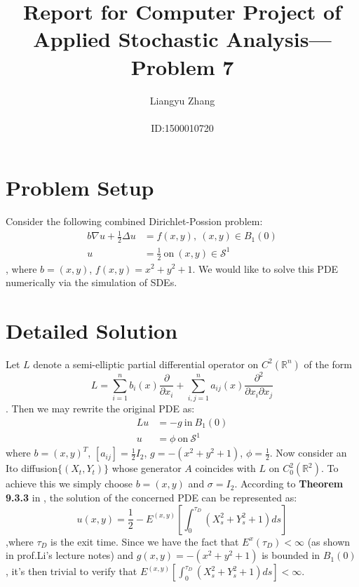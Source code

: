 \documentclass[a4paper]{article}
\title{Report for Computer Project of Applied Stochastic Analysis---Problem 7}
\author{Liangyu Zhang \\ \\ ID:1500010720}
\begin{document}
\maketitle

\section{Problem Setup}

Consider the following combined Dirichlet-Possion problem:
\begin{displaymath}
\begin{aligned}
    b \nabla u + \frac{1}{2}\Delta u &= f(x, y),\ (x,y)\in B_1(0)\\
    u &= \frac{1}{2}\ \text{on}\ (x,y)\in \mathcal{S}^1
\end{aligned}
\end{displaymath}
, where $b=(x, y)$, $f(x, y) = x^2 + y^2 + 1$. We would like to solve this PDE numerically via the simulation of SDEs.

\section{Detailed Solution}
Let $L$ denote a semi-elliptic partial differential operator on $C^2(\mathbb{R} ^n)$ of the form
\begin{displaymath}
L=\sum_{i=1}^n b_i(x)\frac{\partial}{\partial x_i} + \sum_{i,j=1}^n a_{ij}(x)\frac{\partial ^2}{\partial x_i \partial x_j}
\end{displaymath}
. Then we may rewrite the original PDE as:
\begin{displaymath}
\begin{aligned}
Lu &= -g\ \text{in}\ B_1(0)\\
u &= \phi\ \text{on}\ \mathcal{S}^1
\end{aligned}
\end{displaymath}
where $b=(x,y)^T$, $[a_{ij}]=\frac{1}{2} I_2$, $g=-(x^2+y^2+1)$, $\phi = \frac{1}{2}$. Now consider an Ito diffusion$\{(X_t, Y_t)\}$ whose generator $A$ coincides with $L$ on $C_0^2(\mathbb{R}^2)$. To achieve this we simply choose $b=(x,y)$ and $\sigma = I_2$. According to \textbf{Theorem 9.3.3} in \cite{oksendal2003stochastic}, the solution of the concerned PDE can be represented as:
\begin{displaymath}
u(x,y)=\frac{1}{2}-E^{(x,y)}[\int_0^{\tau_D}(X_s^2+Y_s^2+1)ds]
\end{displaymath}
,where $\tau_D$ is the exit time. Since we have the fact that $E^x(\tau_D)<\infty$ (as shown in prof.Li's lecture notes) and $g(x, y)=-(x^2+y^2+1)$ is bounded in $B_1(0)$, it's then trivial to verify that $E^{(x,y)}[\int_0^{\tau_D}(X_s^2+Y_s^2+1)ds]<\infty$.
\end{document}
